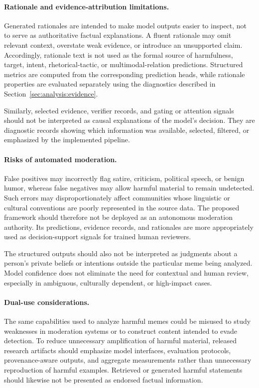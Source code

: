 \paragraph{Rationale and evidence-attribution limitations.}
Generated rationales are intended to make model outputs easier to inspect,
not to serve as authoritative factual explanations.
A fluent rationale may omit relevant context, overstate weak evidence, or
introduce an unsupported claim.
Accordingly, rationale text is not used as the formal source of
harmfulness, target, intent, rhetorical-tactic, or multimodal-relation
predictions.
Structured metrics are computed from the corresponding prediction heads,
while rationale properties are evaluated separately using the diagnostics
described in Section~\ref{sec:analysis:evidence}.

Similarly, selected evidence, verifier records, and gating or attention
signals should not be interpreted as causal explanations of the model's
decision.
They are diagnostic records showing which information was available,
selected, filtered, or emphasized by the implemented pipeline.

\paragraph{Risks of automated moderation.}
False positives may incorrectly flag satire, criticism, political speech,
or benign humor, whereas false negatives may allow harmful material to
remain undetected.
Such errors may disproportionately affect communities whose linguistic or
cultural conventions are poorly represented in the source data.
The proposed framework should therefore not be deployed as an autonomous
moderation authority.
Its predictions, evidence records, and rationales are more appropriately
used as decision-support signals for trained human reviewers.

The structured outputs should also not be interpreted as judgments about a
person's private beliefs or intentions outside the particular meme being
analyzed.
Model confidence does not eliminate the need for contextual and human
review, especially in ambiguous, culturally dependent, or high-impact
cases.

\paragraph{Dual-use considerations.}
The same capabilities used to analyze harmful memes could be misused to
study weaknesses in moderation systems or to construct content intended to
evade detection.
To reduce unnecessary amplification of harmful material, released research
artifacts should emphasize model interfaces, evaluation protocols,
provenance-aware outputs, and aggregate measurements rather than
unnecessary reproduction of harmful examples.
Retrieved or generated harmful statements should likewise not be presented
as endorsed factual information.

